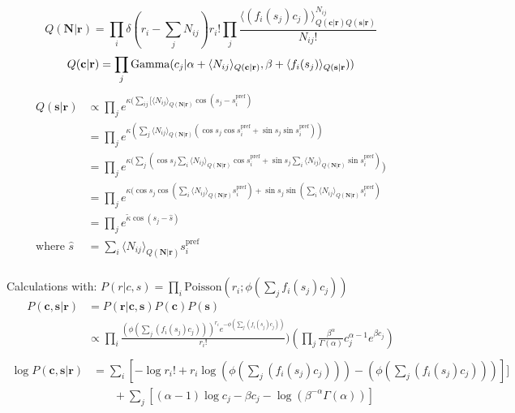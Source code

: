 \documentclass[12pt]{article}
\begin{document}
\begin{equation}
Q(\mathbf{N|r}) = \prod_i \delta(r_i - \sum_j N_{ij}) r_i! \prod_j \frac{\langle (f_i (s_j) c_j) \rangle_{Q(\mathbf{c|r})Q(\mathbf{s|r})}^{N_{ij}}}{N_{ij}!}
\end{equation}
\begin{equation}
Q(\mathbf{c|r}) = \prod_j \text{Gamma} (c_j|\alpha + \langle N_{ij} \rangle_{Q(\mathbf{c|r})}, \beta + \langle f_i (s_j)\rangle_{Q(\mathbf{s|r}}))\\
\end{equation}
\begin{equation}
\begin{aligned}
Q(\mathbf{s|r}) &\propto \prod_j e^{\kappa(\sum_{ij} [\langle N_{ij} \rangle_{Q(\mathbf{N|r})} \cos(s_j - s_i^{\text{pref}})}\\
&= \prod_j e^{\kappa(\sum_{j} \langle N_{ij} \rangle_{Q(\mathbf{N|r})} (\cos s_j \cos s_i^{\text{pref}} + \sin s_j \sin s_i^{\text{pref}}))}\\
&= \prod_j e^{\kappa(\sum_j (\cos s_j \sum_i \langle N_{ij} \rangle_{Q(\mathbf{N|r})} \cos s_i^{\text{pref}} + \sin s_j \sum_i \langle N_{ij} \rangle_{Q(\mathbf{N|r})} \sin s_i^{\text{pref}})})\\
&= \prod_j e^{\kappa(\cos s_j \cos(\sum_i \langle N_{ij} \rangle_{Q(\mathbf{N|r})} s_i^{\text{pref}}) + \sin s_j \sin(\sum_i \langle N_{ij} \rangle_{Q(\mathbf{N|r})} s_i^{\text{pref}})}\\
&= \prod_j e^{\tilde{\kappa} \cos(s_j - \hat{s})}\\
\text{where } \hat{s} &= \sum_i \langle N_{ij} \rangle_{Q(\mathbf{N|r})} s_i^{\text{pref}}
\end{aligned}
\end{equation}
\\
Calculations with:
$P(r|c, s) = \prod_i \text{Poisson}(r_i; \phi(\sum_j f_i(s_j)c_j))$\\
\begin{equation}
\begin{aligned}
P(\mathbf{c, s|r}) & = P(\mathbf{r|c, s}) P(\mathbf{c}) P(\mathbf{s})\\
&\propto \prod_i\frac{(\phi(\sum_j(f_i(s_j)c_j)))^{r_i} e^{-\phi(\sum_j(f_i(s_j)c_j))}}{r_i!}) (\prod_j \frac{\beta^{\alpha}}{\Gamma(\alpha)} c_j^{\alpha - 1}e^{\beta c_j})\\
\end{aligned}
\end{equation}
\begin{equation}
\begin{aligned}
\log P(\mathbf{c, s| r}) &= \sum_i [- \log r_i! + r_i \log(\phi(\sum_j(f_i(s_j)c_j))) - (\phi(\sum_j(f_i(s_j)c_j)))]]\\
& \phantom{{}=1} + \sum_j[(\alpha - 1) \log c_j - \beta c_j - \log (\beta^{- \alpha} \Gamma (\alpha))]\\
\end{aligned}
\end{equation}
\end{document}
